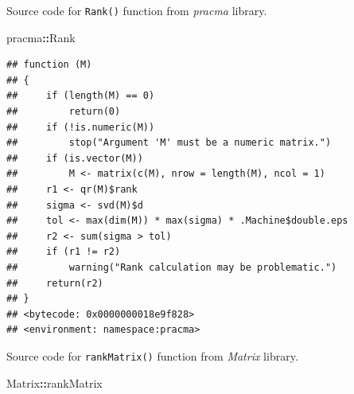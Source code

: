 \documentclass[
]{book}
\newenvironment{Shaded}{\begin{snugshade}}{\end{snugshade}}
\newcommand{\NormalTok}[1]{#1}
\newcommand{\OperatorTok}[1]{\textcolor[rgb]{0.81,0.36,0.00}{\textbf{#1}}}
\begin{document}
Source code for \texttt{Rank()} function from \emph{pracma} library.

\begin{Shaded}
\begin{Highlighting}[]
\NormalTok{pracma}\OperatorTok{::}\NormalTok{Rank}
\end{Highlighting}
\end{Shaded}

\begin{verbatim}
## function (M) 
## {
##     if (length(M) == 0) 
##         return(0)
##     if (!is.numeric(M)) 
##         stop("Argument 'M' must be a numeric matrix.")
##     if (is.vector(M)) 
##         M <- matrix(c(M), nrow = length(M), ncol = 1)
##     r1 <- qr(M)$rank
##     sigma <- svd(M)$d
##     tol <- max(dim(M)) * max(sigma) * .Machine$double.eps
##     r2 <- sum(sigma > tol)
##     if (r1 != r2) 
##         warning("Rank calculation may be problematic.")
##     return(r2)
## }
## <bytecode: 0x0000000018e9f828>
## <environment: namespace:pracma>
\end{verbatim}

Source code for \texttt{rankMatrix()} function from \emph{Matrix} library.

\begin{Shaded}
\begin{Highlighting}[]
\NormalTok{Matrix}\OperatorTok{::}\NormalTok{rankMatrix}
\end{Highlighting}
\end{Shaded}
\end{document}
